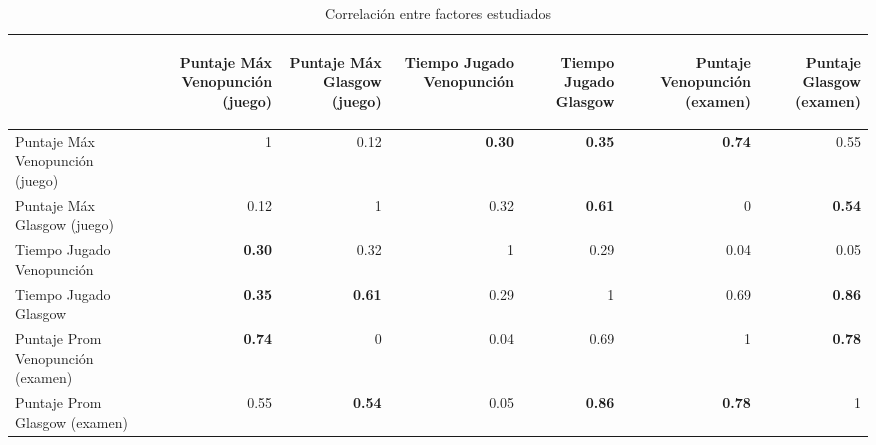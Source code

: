 \begin{table}[H]
\centering

\begin{tabular}{lrrrrrr}
\toprule
        &
\begin{sideways}\textbf{Puntaje Máx Venopunción (juego)}\end{sideways}  &
\begin{sideways}\textbf{Puntaje Máx Glasgow (juego)}\end{sideways}        &
\begin{sideways}\textbf{Tiempo Jugado Venopunción}\end{sideways}         &
\begin{sideways}\textbf{Tiempo Jugado Glasgow}\end{sideways} &
\begin{sideways}\textbf{Puntaje Venopunción (examen)}\end{sideways}  &
\begin{sideways}\textbf{Puntaje Glasgow (examen)}\end{sideways}    \\
\midrule
Puntaje Máx Venopunción (juego)    & 1    & 0.12  & \textbf{0.30}   & \textbf{0.35} & \textbf{0.74} & 0.55 \\
Puntaje Máx Glasgow (juego)       & 0.12 & 1     & 0.32 & \textbf{0.61} & 0 & \textbf{0.54}\\
Tiempo Jugado Venopunción     		 & \textbf{0.30}  & 0.32 & 1  & 0.29 & 0.04 & 0.05\\
Tiempo Jugado Glasgow 				 & \textbf{0.35} & \textbf{0.61}  & 0.29  & 1    & 0.69 & \textbf{0.86}\\
Puntaje Prom Venopunción (examen) & \textbf{0.74} & 0 	& 0.04  & 0.69 & 1 & \textbf{0.78} \\
Puntaje Prom Glasgow (examen)    		 & 0.55 & \textbf{0.54} & 0.05  & \textbf{0.86} & \textbf{0.78} & 1 \\
\bottomrule               
\end{tabular}
\caption{Correlación entre factores estudiados} 
\label{tab:all_correlation}
\end{table}
